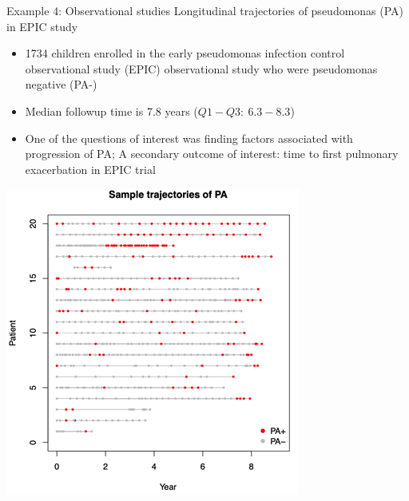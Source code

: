 \documentclass[
  9pt,
  ignorenonframetext,
]{beamer}
\providecommand{\tightlist}{%
  \setlength{\itemsep}{0pt}\setlength{\parskip}{0pt}}
\begin{document}
\begin{frame}{}
\protect\hypertarget{section-3}{}
\begin{block}{Example 4: Observational studies}
\protect\hypertarget{example-4-observational-studies}{}
Longitudinal trajectories of pseudomonas (PA) in EPIC study

\begin{itemize}
\tightlist
\item
  1734 children enrolled in the early pseudomonas infection control
  observational study (EPIC) observational study who were pseudomonas
  negative (PA-)
\item
  Median followup time is 7.8 years (\(Q1 - Q3:\ 6.3 - 8.3\))
\item
  One of the questions of interest was finding factors associated with
  progression of PA; A secondary outcome of interest: time to first
  pulmonary exacerbation in EPIC trial
\end{itemize}

\tiny

\begin{center}\includegraphics[width=0.5\linewidth]{figs_L1/L1-f1} \end{center}

\tiny
\end{block}
\end{frame}
\end{document}
